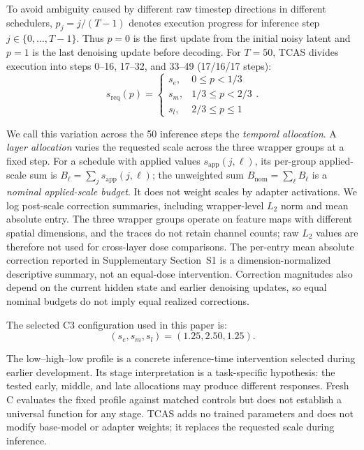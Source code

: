 \documentclass[times,twocolumn,final]{elsarticle}
\begin{document}
To avoid ambiguity caused by different raw timestep directions in different schedulers, $p_j=j/(T-1)$ denotes execution progress for inference step $j\in\{0,\ldots,T-1\}$. Thus $p=0$ is the first update from the initial noisy latent and $p=1$ is the last denoising update before decoding. For $T=50$, TCAS divides execution into steps 0--16, 17--32, and 33--49 (17/16/17 steps):
\begin{equation}
s_{\mathrm{req}}(p) = \begin{cases} s_e, & 0 \leq p < 1/3 \\ s_m, & 1/3 \leq p < 2/3 \\ s_l, & 2/3 \leq p \leq 1 \end{cases}.
\label{eq:tcas}
\end{equation}

We call this variation across the 50 inference steps the \emph{temporal allocation}. A \emph{layer allocation} varies the requested scale across the three wrapper groups at a fixed step. For a schedule with applied values $s_{\mathrm{app}}(j,\ell)$, its per-group applied-scale sum is $B_\ell=\sum_j s_{\mathrm{app}}(j,\ell)$; the unweighted sum $B_{\mathrm{nom}}=\sum_\ell B_\ell$ is a \emph{nominal applied-scale budget}. It does not weight scales by adapter activations. We log post-scale correction summaries, including wrapper-level $L_2$ norm and mean absolute entry. The three wrapper groups operate on feature maps with different spatial dimensions, and the traces do not retain channel counts; raw $L_2$ values are therefore not used for cross-layer dose comparisons. The per-entry mean absolute correction reported in Supplementary Section~S1 is a dimension-normalized descriptive summary, not an equal-dose intervention. Correction magnitudes also depend on the current hidden state and earlier denoising updates, so equal nominal budgets do not imply equal realized corrections.

The selected C3 configuration used in this paper is:
\begin{equation}
(s_e, s_m, s_l) = (1.25, 2.50, 1.25).
\end{equation}

The low--high--low profile is a concrete inference-time intervention selected during earlier development. Its stage interpretation is a task-specific hypothesis: the tested early, middle, and late allocations may produce different responses. Fresh C evaluates the fixed profile against matched controls but does not establish a universal function for any stage. TCAS adds no trained parameters and does not modify base-model or adapter weights; it replaces the requested scale during inference.
\end{document}
